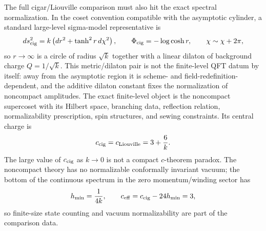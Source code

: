 The full cigar/Liouville comparison must also hit the exact spectral
normalization.  In the coset convention compatible with the asymptotic
cylinder, a standard large-level sigma-model representative is
\begin{equation}
  ds^2_{\rm cig}
  =
  k\left(dr^2+\tanh^2 r\,d\chi^2\right),
  \qquad
  \Phi_{\rm cig}=-\log\cosh r,
  \qquad
  \chi\sim\chi+2\pi ,
  \label{eq:n2-cigar-metric-dilaton-representative}
\end{equation}
so \(r\to\infty\) is a circle of radius \(\sqrt{k}\) together with a linear
dilaton of background charge \(Q=1/\sqrt{k}\).  This metric/dilaton pair is
not the finite-level QFT datum by itself: away from the asymptotic region it is
scheme- and field-redefinition-dependent, and the additive dilaton constant
fixes the normalization of noncompact amplitudes.  The exact finite-level
object is the noncompact supercoset with its Hilbert space, branching data,
reflection relation, normalizability prescription, spin structures, and sewing
constraints.  Its central charge is
\begin{equation}
  c_{\rm cig}=c_{\rm Liouville}=3+\frac6k .
  \label{eq:n2-cigar-liouville-central-charge}
\end{equation}
The large value of \(c_{\rm cig}\) as \(k\to0\) is not a compact
\(c\)-theorem paradox.  The noncompact theory has no normalizable conformally
invariant vacuum; the bottom of the continuous spectrum in the zero
momentum/winding sector has
\[
  h_{\min}=\frac1{4k},
  \qquad
  c_{\rm eff}=c_{\rm cig}-24h_{\min}=3,
\]
so finite-size state counting and vacuum normalizability are part of the
comparison data.

